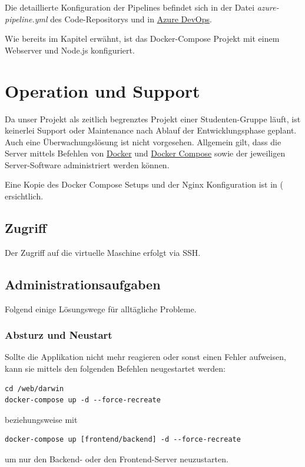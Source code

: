 \documentclass[11pt,a4paper,german]{scrartcl}
\let\oldsection\section
\renewcommand\section{\clearpage\oldsection}
\begin{document}
Die detaillierte Konfiguration der Pipelines befindet sich in der Datei \textit{azure-pipeline.yml} des Code-Repositorys und in \href{https://dev.azure.com/schaumic/darwin/_build}{Azure DevOps}.

Wie bereits im Kapitel \textit{} erwähnt, ist das Docker-Compose Projekt mit einem Webserver und Node.js konfiguriert.

\section{Operation und Support}
Da unser Projekt als zeitlich begrenztes Projekt einer Studenten-Gruppe läuft, ist keinerlei Support oder Maintenance nach Ablauf der Entwicklungsphase geplant. Auch eine Überwachungslösung ist nicht vorgesehen. Allgemein gilt, dass die Server mittels Befehlen von \href{https://docs.docker.com/engine/reference/commandline/docker/}{Docker} und \href{https://docs.docker.com/compose/reference/overview/}{Docker Compose} sowie der jeweiligen Server-Software administriert werden können.

Eine Kopie des Docker Compose Setups und der Nginx Konfiguration ist in ( ersichtlich.

\subsection{Zugriff}
Der Zugriff auf die virtuelle Maschine erfolgt via SSH.

\subsection{Administrationsaufgaben}
Folgend einige Lösungswege für alltägliche Probleme.

\subsubsection{Absturz und Neustart}
Sollte die Applikation nicht mehr reagieren oder sonst einen Fehler aufweisen, kann sie mittels den folgenden Befehlen neugestartet werden:
\begin{verbatim}
cd /web/darwin
docker-compose up -d --force-recreate
\end{verbatim}
beziehungsweise mit
\begin{verbatim}
docker-compose up [frontend/backend] -d --force-recreate
\end{verbatim}
um nur den Backend- oder den Frontend-Server neuzustarten.
\end{document}
